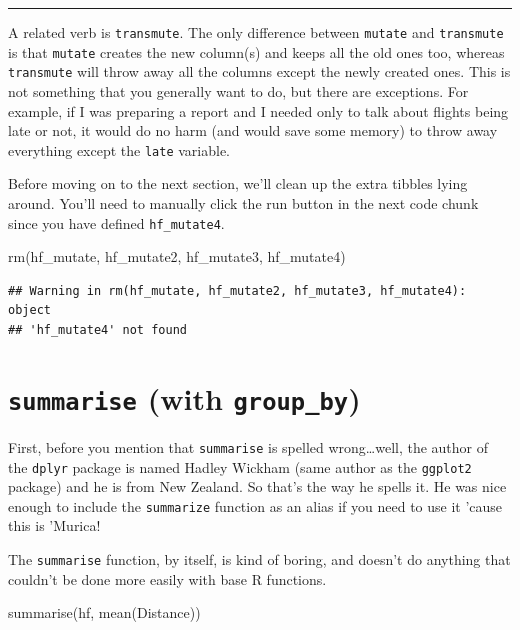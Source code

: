 \documentclass[
]{book}
\newenvironment{Shaded}{\begin{snugshade}}{\end{snugshade}}
\newcommand{\FunctionTok}[1]{\textcolor[rgb]{0.00,0.00,0.00}{#1}}
\newcommand{\NormalTok}[1]{#1}
\begin{document}
\begin{center}\rule{0.5\linewidth}{0.5pt}\end{center}

A related verb is \texttt{transmute}. The only difference between \texttt{mutate} and \texttt{transmute} is that \texttt{mutate} creates the new column(s) and keeps all the old ones too, whereas \texttt{transmute} will throw away all the columns except the newly created ones. This is not something that you generally want to do, but there are exceptions. For example, if I was preparing a report and I needed only to talk about flights being late or not, it would do no harm (and would save some memory) to throw away everything except the \texttt{late} variable.

Before moving on to the next section, we'll clean up the extra tibbles lying around. You'll need to manually click the run button in the next code chunk since you have defined \texttt{hf\_mutate4}.

\begin{Shaded}
\begin{Highlighting}[]
\FunctionTok{rm}\NormalTok{(hf\_mutate, hf\_mutate2, hf\_mutate3, hf\_mutate4)}
\end{Highlighting}
\end{Shaded}

\begin{verbatim}
## Warning in rm(hf_mutate, hf_mutate2, hf_mutate3, hf_mutate4): object
## 'hf_mutate4' not found
\end{verbatim}

\hypertarget{manipulating-summ-group}{%
\section{\texorpdfstring{\texttt{summarise} (with \texttt{group\_by})}{summarise (with group\_by)}}\label{manipulating-summ-group}}

First, before you mention that \texttt{summarise} is spelled wrong\ldots well, the author of the \texttt{dplyr} package is named Hadley Wickham (same author as the \texttt{ggplot2} package) and he is from New Zealand. So that's the way he spells it. He was nice enough to include the \texttt{summarize} function as an alias if you need to use it 'cause this is 'Murica!

The \texttt{summarise} function, by itself, is kind of boring, and doesn't do anything that couldn't be done more easily with base R functions.

\begin{Shaded}
\begin{Highlighting}[]
\FunctionTok{summarise}\NormalTok{(hf, }\FunctionTok{mean}\NormalTok{(Distance))}
\end{Highlighting}
\end{Shaded}
\end{document}
